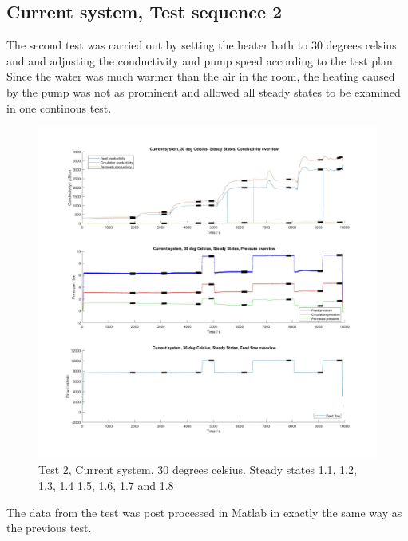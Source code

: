 \newpage

\subsection{Current system, Test sequence 2}

The second test was carried out by setting the heater bath to 30 degrees celsius and and adjusting the conductivity and pump speed according to the test plan. Since the water was much warmer than the air in the room, the heating caused by the pump was not as prominent and allowed all steady states to be examined in one continous test.

\begin{figure}[H]
    \centering
    \includegraphics[width=1.1\textwidth]{overview30}
    \caption{Test 2, Current system, 30 degrees celsius. Steady states 1.1, 1.2, 1.3, 1.4 1.5, 1.6, 1.7 and 1.8}
    \label{fig:PressConn}
\end{figure}

\newpage


The data from the test was post processed in Matlab in exactly the same way as the previous test.

